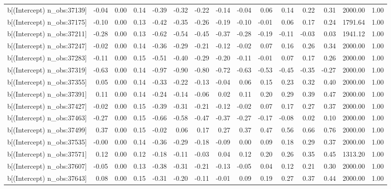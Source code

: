 \begin{table}[ht]
\begin{tabular}{rrrrrrrrrrrrrrr}
  b[(Intercept) n\_obs:37139] & -0.04 & 0.00 & 0.14 & -0.39 & -0.32 & -0.22 & -0.14 & -0.04 & 0.06 & 0.14 & 0.22 & 0.31 & 2000.00 & 1.00 \\ 
  b[(Intercept) n\_obs:37175] & -0.10 & 0.00 & 0.13 & -0.42 & -0.35 & -0.26 & -0.19 & -0.10 & -0.01 & 0.06 & 0.17 & 0.24 & 1791.64 & 1.00 \\ 
  b[(Intercept) n\_obs:37211] & -0.28 & 0.00 & 0.13 & -0.62 & -0.54 & -0.45 & -0.37 & -0.28 & -0.19 & -0.11 & -0.03 & 0.03 & 1941.12 & 1.00 \\ 
  b[(Intercept) n\_obs:37247] & -0.02 & 0.00 & 0.14 & -0.36 & -0.29 & -0.21 & -0.12 & -0.02 & 0.07 & 0.16 & 0.26 & 0.34 & 2000.00 & 1.00 \\ 
  b[(Intercept) n\_obs:37283] & -0.11 & 0.00 & 0.15 & -0.51 & -0.40 & -0.29 & -0.20 & -0.11 & -0.01 & 0.07 & 0.17 & 0.26 & 2000.00 & 1.00 \\ 
  b[(Intercept) n\_obs:37319] & -0.63 & 0.00 & 0.14 & -0.97 & -0.90 & -0.80 & -0.72 & -0.63 & -0.53 & -0.45 & -0.35 & -0.27 & 2000.00 & 1.00 \\ 
  b[(Intercept) n\_obs:37355] & 0.05 & 0.00 & 0.14 & -0.33 & -0.22 & -0.13 & -0.04 & 0.06 & 0.15 & 0.23 & 0.32 & 0.40 & 2000.00 & 1.00 \\ 
  b[(Intercept) n\_obs:37391] & 0.11 & 0.00 & 0.14 & -0.24 & -0.14 & -0.06 & 0.02 & 0.11 & 0.20 & 0.29 & 0.39 & 0.47 & 2000.00 & 1.00 \\ 
  b[(Intercept) n\_obs:37427] & -0.02 & 0.00 & 0.15 & -0.39 & -0.31 & -0.21 & -0.12 & -0.02 & 0.07 & 0.17 & 0.27 & 0.37 & 2000.00 & 1.00 \\ 
  b[(Intercept) n\_obs:37463] & -0.27 & 0.00 & 0.15 & -0.66 & -0.58 & -0.47 & -0.37 & -0.27 & -0.17 & -0.08 & 0.02 & 0.10 & 2000.00 & 1.00 \\ 
  b[(Intercept) n\_obs:37499] & 0.37 & 0.00 & 0.15 & -0.02 & 0.06 & 0.17 & 0.27 & 0.37 & 0.47 & 0.56 & 0.66 & 0.76 & 2000.00 & 1.00 \\ 
  b[(Intercept) n\_obs:37535] & -0.00 & 0.00 & 0.14 & -0.36 & -0.29 & -0.18 & -0.09 & 0.00 & 0.09 & 0.18 & 0.29 & 0.37 & 2000.00 & 1.00 \\ 
  b[(Intercept) n\_obs:37571] & 0.12 & 0.00 & 0.12 & -0.18 & -0.11 & -0.03 & 0.04 & 0.12 & 0.20 & 0.26 & 0.35 & 0.45 & 1313.20 & 1.00 \\ 
  b[(Intercept) n\_obs:37607] & -0.05 & 0.00 & 0.13 & -0.38 & -0.31 & -0.21 & -0.13 & -0.05 & 0.04 & 0.12 & 0.21 & 0.30 & 2000.00 & 1.00 \\ 
  b[(Intercept) n\_obs:37643] & 0.08 & 0.00 & 0.15 & -0.31 & -0.20 & -0.11 & -0.01 & 0.09 & 0.19 & 0.27 & 0.37 & 0.44 & 2000.00 & 1.00 \\ 

\end{tabular}
\end{table}
